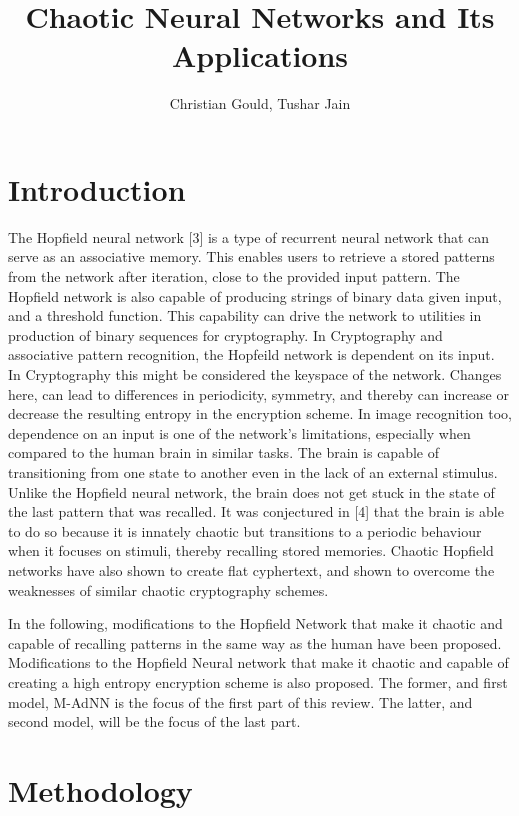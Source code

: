\documentclass[12pt, letterpaper]{article}
\title{Chaotic Neural Networks and Its Applications}
\author{Christian Gould, Tushar Jain}
\date{}
\begin{document}
\maketitle

\newpage

\section*{Introduction}

The Hopfield neural network [3] is a type of recurrent neural network that can serve as an associative memory. This enables users to retrieve a stored patterns from the network after iteration, close to the provided input pattern. The Hopfield network is also capable of producing strings of binary data given input, and a threshold function. This capability can drive the network to utilities in production of binary sequences for cryptography. In Cryptography and associative pattern recognition, the Hopfeild network is dependent on its input. In Cryptography this might be considered the keyspace of the network. Changes here, can lead to differences in periodicity, symmetry, and thereby can increase or decrease the resulting entropy in the encryption scheme. In image recognition too, dependence on an input is one of the network's limitations, especially when compared to the human brain in similar tasks.  The brain is capable of transitioning from one state to another even in the lack of an external stimulus. Unlike the Hopfield neural network, the brain does not get stuck in the state of the last pattern that was recalled. It was conjectured in [4] that the brain is able to do so because it is innately chaotic but transitions to a periodic behaviour when it focuses on stimuli, thereby recalling stored memories. Chaotic Hopfield networks have also shown to create flat cyphertext, and shown to overcome the weaknesses of similar chaotic cryptography schemes.  

In the following, modifications to the Hopfield Network that make it chaotic and capable of recalling patterns in the same way as the human have been proposed. Modifications to the Hopfield Neural network that make it chaotic and capable of creating a high entropy encryption scheme is also proposed. The former, and first model, M-AdNN is the focus of the first part of this review.  The latter, and second model,  will be the focus of the last part. 

\section*{Methodology}
\end{document}
